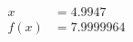 \documentclass[preview]{standalone}
\begin{document}
\begin{align*}
x &= 4.9947\\f(x) &= 7.9999964
\end{align*}
\end{document}
